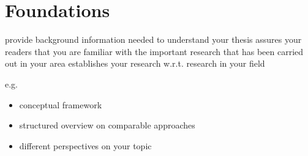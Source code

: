 \chapter{Foundations}
\label{sec:Foundations}

provide background information needed to understand your thesis
assures your readers that you are familiar with the important research that has been carried out in your area
establishes your research w.r.t. research in your field

e.g.\
\begin{itemize}
  \item conceptual framework
  \item structured overview on comparable approaches
  \item different perspectives on your topic
\end{itemize}

 \cite{EckartDeCastilho2014} 